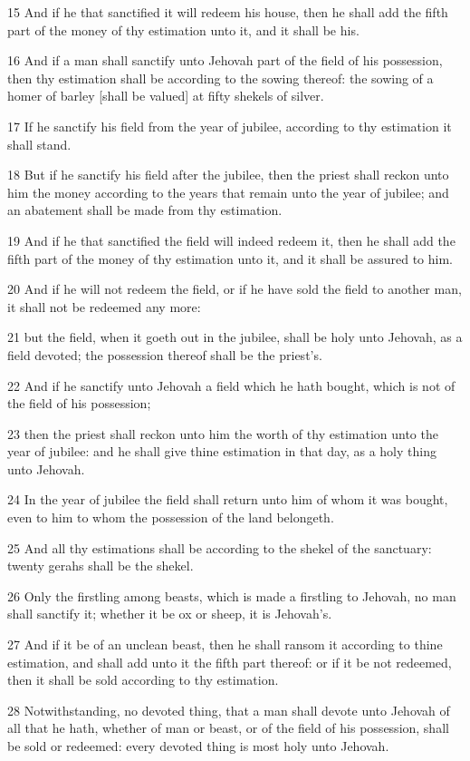 \par 15 And if he that sanctified it will redeem his house, then he shall add the fifth part of the money of thy estimation unto it, and it shall be his.
\par 16 And if a man shall sanctify unto Jehovah part of the field of his possession, then thy estimation shall be according to the sowing thereof: the sowing of a homer of barley [shall be valued] at fifty shekels of silver.
\par 17 If he sanctify his field from the year of jubilee, according to thy estimation it shall stand.
\par 18 But if he sanctify his field after the jubilee, then the priest shall reckon unto him the money according to the years that remain unto the year of jubilee; and an abatement shall be made from thy estimation.
\par 19 And if he that sanctified the field will indeed redeem it, then he shall add the fifth part of the money of thy estimation unto it, and it shall be assured to him.
\par 20 And if he will not redeem the field, or if he have sold the field to another man, it shall not be redeemed any more:
\par 21 but the field, when it goeth out in the jubilee, shall be holy unto Jehovah, as a field devoted; the possession thereof shall be the priest's.
\par 22 And if he sanctify unto Jehovah a field which he hath bought, which is not of the field of his possession;
\par 23 then the priest shall reckon unto him the worth of thy estimation unto the year of jubilee: and he shall give thine estimation in that day, as a holy thing unto Jehovah.
\par 24 In the year of jubilee the field shall return unto him of whom it was bought, even to him to whom the possession of the land belongeth.
\par 25 And all thy estimations shall be according to the shekel of the sanctuary: twenty gerahs shall be the shekel.
\par 26 Only the firstling among beasts, which is made a firstling to Jehovah, no man shall sanctify it; whether it be ox or sheep, it is Jehovah's.
\par 27 And if it be of an unclean beast, then he shall ransom it according to thine estimation, and shall add unto it the fifth part thereof: or if it be not redeemed, then it shall be sold according to thy estimation.
\par 28 Notwithstanding, no devoted thing, that a man shall devote unto Jehovah of all that he hath, whether of man or beast, or of the field of his possession, shall be sold or redeemed: every devoted thing is most holy unto Jehovah.
